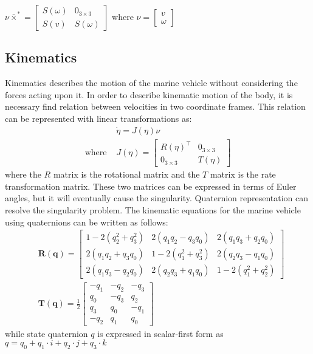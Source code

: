     $
    \nu\bar{\times}^*=\left[\begin{array}{ll}
        S(\omega) & 0_{3 \times 3} \\
        S(v) & S(\omega)
    \end{array}\right]
    $ where $\nu = \left[\begin{array}{l}
        v \\
        \omega
    \end{array}\right]$

\subsection{Kinematics}

    Kinematics describes the motion of the marine vehicle without considering the forces acting upon it.
    In order to describe kinematic motion of the body, it is necessary find relation between velocities in two coordinate frames.
    This relation can be represented with linear transformations as:
    $$
    \begin{aligned}
        & \dot{\eta}=J(\eta) \nu \\
        \text{where } & J(\eta)=\left[\begin{array}{cc}
        R(\eta)^{\top} & 0_{3 \times 3} \\
        0_{3 \times 3} & T(\eta)
        \end{array}\right]
    \end{aligned}
    $$
    where the $R$ matrix is the rotational matrix and the $T$ matrix is the rate transformation matrix. 
    These two matrices can be expressed in terms of Euler angles, but it will eventually cause the singularity. 
    Quaternion representation can resolve the singularity problem. 
    The kinematic equations for the marine vehicle using quaternions can be written as follows:
    $$
    \begin{aligned}
    & \boldsymbol{R}(\boldsymbol{q})=\left[\begin{array}{ccc}
        1-2\left(q_2^2+q_3^2\right) & 2\left(q_1 q_2-q_3 q_0\right) & 2\left(q_1 q_3+q_2 q_0\right) \\
        2\left(q_1 q_2+q_3 q_0\right) & 1-2\left(q_1^2+q_3^2\right) & 2\left(q_2 q_3-q_1 q_0\right) \\
        2\left(q_1 q_3-q_2 q_0\right) & 2\left(q_2 q_3+q_1 q_0\right) & 1-2\left(q_1^2+q_2^2\right)
        \end{array}\right]\\
    & \boldsymbol{T}(\boldsymbol{q})=\frac{1}{2}\left[\begin{array}{rrr}
        -q_1 & -q_2 & -q_3 \\
        q_0 & -q_3 & q_2 \\
        q_3 & q_0 & -q_1 \\
        -q_2 & q_1 & q_0
        \end{array}\right]
    \end{aligned}
    $$
    while state quaternion $q$ is expressed in scalar-first form as 
    $q = q_0 + q_1\cdot i + q_2\cdot j + q_3\cdot k$


